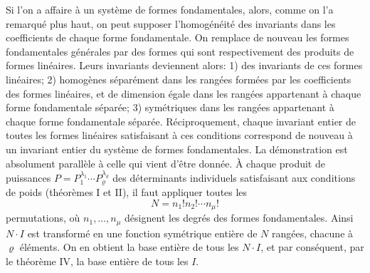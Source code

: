 Si l'on a affaire à un système de formes fondamentales, alors, comme on l'a remarqué plus haut, on peut supposer l'homogénéité des invariants dans les coefficients de chaque forme fondamentale. On remplace de nouveau les formes fondamentales générales par des formes qui sont respectivement des produits de formes linéaires. Leurs invariants deviennent alors: 1) des invariants de ces formes linéaires; 2) homogènes séparément dans les rangées formées par les coefficients des formes linéaires, et de dimension égale dans les rangées appartenant à chaque forme fondamentale séparée; 3) symétriques dans les rangées appartenant à chaque forme fondamentale séparée. Réciproquement, chaque invariant entier de toutes les formes linéaires satisfaisant à ces conditions correspond de nouveau à un invariant entier du système de formes fondamentales. La démonstration est absolument parallèle à celle qui vient d'être donnée. À chaque produit de puissances $P=P_1^{\lambda_1}\cdots P_\varrho^{\lambda_\varrho}$ des déterminants individuels satisfaisant aux conditions de poids (théorèmes I et II), il faut appliquer toutes les
\[
        N=n_1!n_2!\cdots n_\mu!
\]
permutations, où $n_1,\ldots,n_\mu$ désignent les degrés des formes fondamentales. Ainsi $N\cdot I$ est transformé en une fonction symétrique entière de $N$ rangées, chacune à $\varrho$ éléments. On en obtient la base entière de tous les $N\cdot I$, et par conséquent, par le théorème IV, la base entière de tous les $I$.
